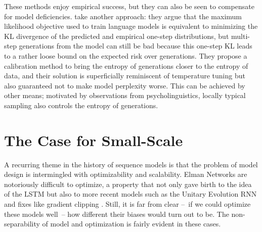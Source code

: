 \documentclass[12pt,a4paper,oneside]{book}
\begin{document}
These methods enjoy empirical success, but they can also be seen to compensate for model deficiencies.
 take another approach: they argue that the maximum likelihood objective used to train language models is equivalent to minimizing the KL divergence of the predicted and empirical one-step distributions, but multi-step generations from the model can still be bad because this one-step KL leads to a rather loose bound on the expected risk over generations.
They propose a calibration method to bring the entropy of generations closer to the entropy of data, and their solution is superficially reminiscent of temperature tuning but also guaranteed not to make model perplexity worse.
This can be achieved by other means; motivated by observations from psycholinguistics, locally typical sampling \citep{meister2022typical} also controls the entropy of generations.


\section{The Case for Small-Scale}

A recurring theme in the history of sequence models is that the problem of model design is intermingled with optimizability and scalability.
Elman Networks are notoriously difficult to optimize, a property that not only gave birth to the idea of the LSTM but also to more recent models such as the Unitary Evolution RNN \citep{arjovsky2016unitary} and fixes like gradient clipping \citep{pascanu2013difficulty}.
Still, it is far from clear --~if we could optimize these models well~-- how different their biases would turn out to be.
The non-separability of model and optimization is fairly evident in these cases.
\end{document}

